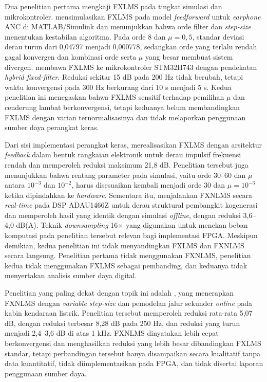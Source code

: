 Dua penelitian pertama mengkaji FXLMS pada tingkat simulasi dan mikrokontroler. \textcite{xie2022} mensimulasikan FXLMS pada model \emph{feedforward} untuk \emph{earphone} ANC di MATLAB/Simulink dan menunjukkan bahwa orde filter dan \emph{step-size} menentukan kestabilan algoritma. Pada orde 8 dan $\mu = 0{,}5$, standar deviasi derau turun dari 0,04797 menjadi 0,000778, sedangkan orde yang terlalu rendah gagal konvergen dan kombinasi orde serta $\mu$ yang besar membuat sistem divergen. \textcite{han2023} membawa FXLMS ke mikrokontroler STM32H743 dengan pendekatan \emph{hybrid fixed-filter}. Reduksi sekitar 15 dB pada 200 Hz tidak berubah, tetapi waktu konvergensi pada 300 Hz berkurang dari 10 s menjadi 5 s. Kedua penelitian ini menegaskan bahwa FXLMS sensitif terhadap pemilihan $\mu$ dan cenderung lambat berkonvergensi, tetapi keduanya belum membandingkan FXLMS dengan varian ternormalisasinya dan tidak melaporkan penggunaan sumber daya perangkat keras.

Dari sisi implementasi perangkat keras, \textcite{chen2025} merealisasikan FXLMS dengan arsitektur \emph{feedback} dalam bentuk rangkaian elektronik untuk derau impulsif frekuensi rendah dan memperoleh reduksi maksimum 21,8 dB. Penelitian tersebut juga menunjukkan bahwa rentang parameter pada simulasi, yaitu orde 30--60 dan $\mu$ antara $10^{-3}$ dan $10^{-2}$, harus disesuaikan kembali menjadi orde 30 dan $\mu = 10^{-3}$ ketika dipindahkan ke \emph{hardware}. Sementara itu, \textcite{voltolini2023} menjalankan FXNLMS secara \emph{real-time} pada DSP ADAU1466Z untuk derau struktural pembangkit kogenerasi dan memperoleh hasil yang identik dengan simulasi \emph{offline}, dengan reduksi 3,6--4,0 dB(A). Teknik \emph{downsampling} 16$\times$ yang digunakan untuk menekan beban komputasi pada penelitian tersebut relevan bagi implementasi FPGA. Meskipun demikian, kedua penelitian ini tidak menyandingkan FXLMS dan FXNLMS secara langsung. Penelitian pertama tidak menggunakan FXNLMS, penelitian kedua tidak menggunakan FXLMS sebagai pembanding, dan keduanya tidak menyertakan analisis sumber daya digital.

Penelitian yang paling dekat dengan topik ini adalah \textcite{cesur2025}, yang menerapkan FXNLMS dengan \emph{variable step-size} dan pemodelan jalur sekunder \emph{online} pada kabin kendaraan listrik. Penelitian tersebut memperoleh reduksi rata-rata 5,07 dB, dengan reduksi terbesar 8,28 dB pada 250 Hz, dan reduksi yang turun menjadi 2,4--3,6 dB di atas 1 kHz. FXNLMS dinyatakan lebih cepat berkonvergensi dan menghasilkan reduksi yang lebih besar dibandingkan FXLMS standar, tetapi perbandingan tersebut hanya disampaikan secara kualitatif tanpa data kuantitatif, tidak diimplementasikan pada FPGA, dan tidak disertai laporan penggunaan sumber daya.

